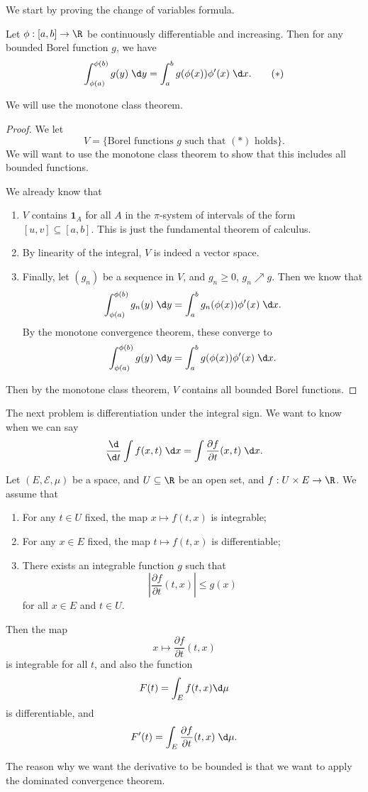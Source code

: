 \documentclass[a4paper]{article}
\begin{document}
We start by proving the change of variables formula.
\begin{prop}
  Let $\phi: [a, b] \to \R$ be continuously differentiable and increasing. Then for any bounded Borel function $g$, we have
  \[
    \int_{\phi(a)}^{\phi(b)} g(y) \;\d y = \int_a^b g(\phi(x))\phi'(x)\;\d x.\tag{$*$}
  \]
\end{prop}

We will use the monotone class theorem.
\begin{proof}
  We let
  \[
    V = \{\text{Borel functions $g$ such that $(*)$ holds}\}.
  \]
  We will want to use the monotone class theorem to show that this includes all bounded functions.

  We already know that
  \begin{enumerate}
    \item $V$ contains $\mathbf{1}_A$ for all $A$ in the $\pi$-system of intervals of the form $[u, v] \subseteq [a, b]$. This is just the fundamental theorem of calculus.
    \item By linearity of the integral, $V$ is indeed a vector space.
    \item Finally, let $(g_n)$ be a sequence in $V$, and $g_n \geq 0$, $g_n \nearrow g$. Then we know that
      \[
        \int_{\phi(a)}^{\phi(b)} g_n(y) \;\d y = \int_a^b g_n(\phi(x))\phi'(x)\;\d x.
      \]
      By the monotone convergence theorem, these converge to
      \[
        \int_{\phi(a)}^{\phi(b)} g(y) \;\d y = \int_a^b g(\phi(x))\phi'(x) \;\d x.
      \]
  \end{enumerate}
  Then by the monotone class theorem, $V$ contains all bounded Borel functions.
\end{proof}

The next problem is differentiation under the integral sign. We want to know when we can say
\[
  \frac{\d}{\d t} \int f(x, t) \;\d x = \int \frac{\partial f}{\partial t}(x, t) \;\d x.
\]

\begin{thm}
  Let $(E, \mathcal{E}, \mu)$ be a space, and $U \subseteq \R$ be an open set, and $f: U \times E \to \R$. We assume that
  \begin{enumerate}
    \item For any $t \in U$ fixed, the map $x \mapsto f(t, x)$ is integrable;
    \item For any $x \in E$ fixed, the map $t \mapsto f(t, x)$ is differentiable;
    \item There exists an integrable function $g$ such that
      \[
        \left|\frac{\partial f}{\partial t}(t, x)\right| \leq g(x)
      \]
      for all $x \in E$ and $t \in U$.
  \end{enumerate}
  Then the map
  \[
    x \mapsto \frac{\partial f}{\partial t}(t, x)
  \]
  is integrable for all $t$, and also the function
  \[
    F(t) = \int_E f(t, x) \d \mu
  \]
  is differentiable, and
  \[
    F'(t) = \int_E \frac{\partial f}{\partial t}(t, x)\;\d \mu.
  \]
\end{thm}
The reason why we want the derivative to be bounded is that we want to apply the dominated convergence theorem.
\end{document}
